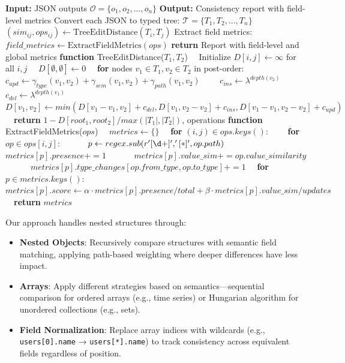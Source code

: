 \documentclass[letterpaper]{article} %
\begin{document}
\begin{algorithm}
\caption{Field-Aware Consistency Evaluation for Nested JSON}
\label{alg:nested_json}
\begin{algorithmic}[1]
\STATE \textbf{Input:} JSON outputs $\mathcal{O} = \{o_1, o_2, ..., o_n\}$
\STATE \textbf{Output:} Consistency report with field-level metrics
\STATE Convert each JSON to typed tree: $\mathcal{T} = \{T_1, T_2, ..., T_n\}$
    \STATE $(sim_{ij}, ops_{ij}) \gets \text{TreeEditDistance}(T_i, T_j)$
\ENDFOR
\STATE Extract field metrics: $field\_metrics \gets \text{ExtractFieldMetrics}(ops)$
\STATE \textbf{return} Report with field-level and global metrics
\STATE
\STATE \textbf{function} TreeEditDistance($T_1, T_2$)
\STATE \ \ Initialize $D[i,j] \gets \infty$ for all $i,j$
\STATE \ \ $D[\emptyset,\emptyset] \gets 0$
\STATE \ \ \textbf{for} nodes $v_1 \in T_1, v_2 \in T_2$ in post-order:
\STATE \ \ \ \ $c_{upd} \gets \gamma_{type}(v_1,v_2) + \gamma_{sem}(v_1,v_2) + \gamma_{path}(v_1,v_2)$
\STATE \ \ \ \ $c_{ins} \gets \lambda^{depth(v_2)}$
\STATE \ \ \ \ $c_{del} \gets \lambda^{depth(v_1)}$
\STATE \ \ \ \ $D[v_1,v_2] \gets min(D[v_1-v_1,v_2]+c_{del}, D[v_1,v_2-v_2]+c_{ins}, D[v_1-v_1,v_2-v_2]+c_{upd})$
\STATE \ \ \textbf{return} $1-D[root_1,root_2]/max(|T_1|,|T_2|)$, operations
\STATE
\STATE \textbf{function} ExtractFieldMetrics($ops$)
\STATE \ \ $metrics \gets \{\}$
\STATE \ \ \textbf{for} $(i,j) \in ops.keys()$:
\STATE \ \ \ \ \textbf{for} $op \in ops[i,j]$:
\STATE \ \ \ \ \ \ $p \gets regex.sub(r'[\d+]', '[*]', op.path)$
\STATE \ \ \ \ \ \ $metrics[p].presence += 1$
\STATE \ \ \ \ \ \ $metrics[p].value\_sim += op.value\_similarity$
\STATE \ \ \ \ \ \ $metrics[p].type\_changes[op.from\_type,op.to\_type] += 1$
\STATE \ \ \textbf{for} $p \in metrics.keys()$:
\STATE \ \ \ \ $metrics[p].score \gets \alpha \cdot metrics[p].presence/total + \beta \cdot metrics[p].value\_sim/updates$
\STATE \ \ \textbf{return} $metrics$
\end{algorithmic}
\end{algorithm}

Our approach handles nested structures through:

\begin{itemize}
\item \textbf{Nested Objects}: Recursively compare structures with semantic field matching, applying path-based weighting where deeper differences have less impact.

\item \textbf{Arrays}: Apply different strategies based on semantics—sequential comparison for ordered arrays (e.g., time series) or Hungarian algorithm for unordered collections (e.g., sets).

\item \textbf{Field Normalization}: Replace array indices with wildcards (e.g., \texttt{users[0].name} → \texttt{users[*].name}) to track consistency across equivalent fields regardless of position.
\end{itemize}
\end{document}
